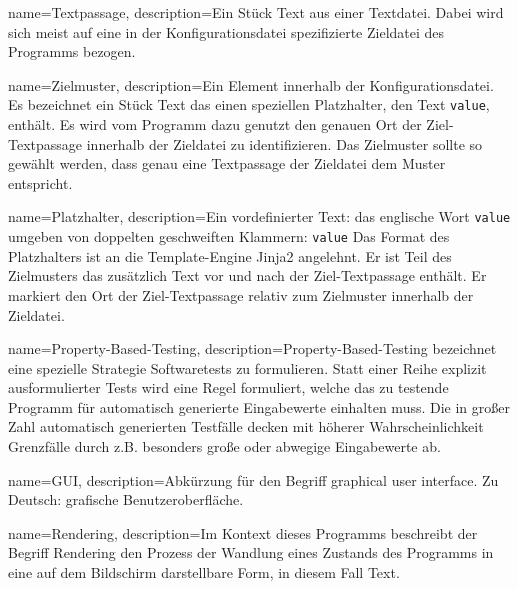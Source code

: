 \makeglossaries

{
    name=Textpassage,
    description={Ein Stück Text aus einer Textdatei. Dabei
            wird sich meist auf eine in der Konfigurationsdatei spezifizierte
            Zieldatei des Programms bezogen.}
}

{
    name=Zielmuster,
    description={Ein Element innerhalb der Konfigurationsdatei. Es bezeichnet ein
            Stück Text das einen speziellen \gls{Platzhalter}, den Text \texttt{{{value}}},
            enthält. Es wird vom Programm dazu genutzt den genauen Ort der Ziel-\gls{Textpassage}
            innerhalb der Zieldatei zu identifizieren. Das Zielmuster sollte so gewählt
            werden, dass genau eine Textpassage der Zieldatei dem Muster entspricht.}
}

{
    name=Platzhalter,
    description={Ein vordefinierter Text: das englische Wort \texttt{value}
            umgeben von doppelten geschweiften Klammern:
            \texttt{{{value}}} Das Format des Platzhalters ist an
            die Template-Engine Jinja2 \cite{jinja2} angelehnt.
            Er ist Teil des \gls{Zielmuster}s das zusätzlich Text vor und nach
            der Ziel-\gls{Textpassage} enthält. Er markiert den Ort der Ziel-\gls{Textpassage}
            relativ zum \gls{Zielmuster} innerhalb der Zieldatei.}
}

{
    name=Property-Based-Testing,
    description={Property-Based-Testing bezeichnet eine spezielle Strategie Softwaretests
            zu formulieren. Statt einer Reihe explizit ausformulierter Tests wird eine Regel
            formuliert, welche das zu testende Programm für automatisch generierte Eingabewerte
            einhalten muss. Die in großer Zahl automatisch generierten Testfälle
            decken mit höherer Wahrscheinlichkeit Grenzfälle durch z.B. besonders
            große oder abwegige Eingabewerte ab.}
}

{
    name=GUI,
    description={Abkürzung für den Begriff graphical user interface. Zu Deutsch:
            grafische Benutzeroberfläche.}
}

{
    name=Rendering,
    description={Im Kontext dieses Programms beschreibt der Begriff Rendering den
            Prozess der Wandlung eines Zustands des Programms in eine auf dem Bildschirm
            darstellbare Form, in diesem Fall Text.}
}

